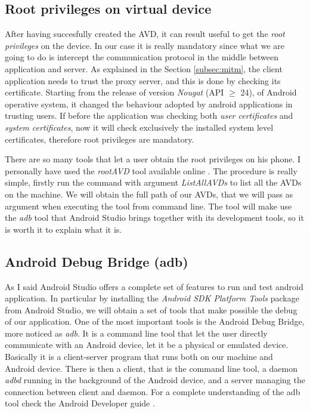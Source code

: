 		\subsection{Root privileges on virtual device}
			\par After having succesfully created the AVD, it can result useful to get the \textit{root privileges} on the device. In our case it is really mandatory since what we are going to do is intercept the communication protocol in the middle between application and server. As explained in the Section \ref{subsec:mitm}, the client application needs to trust the proxy server, and this is done by checking its certificate. Starting from the release of version \textit{Nougat} (API $\ge$ 24), of Android operative system, it changed the behaviour adopted by android applications in trusting users. If before the application was checking both \textit{user certificates} and \textit{system certificates}, now it will check exclusively the installed system level certificates, therefore root privileges are mandatory. \newline
			\par There are so many tools that let a user obtain the root privileges on his phone. I personally have used the \textit{rootAVD} tool available online \cite{rootAVD}. The procedure is really simple, firstly run the command with argument \textit{ListAllAVDs} to list all the AVDs on the machine. We will obtain the full path of our AVDs, that we will pass as argument when executing the tool from command line. The tool will make use the \textit{adb} tool that Android Studio brings together with its development tools, so it is worth it to explain what it is.
		
		\subsection{Android Debug Bridge (adb)}
			\par As I said Android Studio offers a complete set of features to run and test android application. In particular by installing the \textit{Android SDK Platform Tools} package from Android Studio, we will obtain a set of tools that make possible the debug of our application. \newline
			One of the most important tools is the Android Debug Bridge, more noticed as \textit{adb}. It is a command line tool that let the user directly communicate with an Android device, let it be a physical or emulated device. Basically it is a client-server program that runs both on our machine and Android device. There is then a client, that is the command line tool, a daemon \textit{adbd} running in the background of the Android device, and a server managing the connection between client and daemon. For a complete understanding of the adb tool check the Android Developer guide \cite{adb}.
		\newpage
